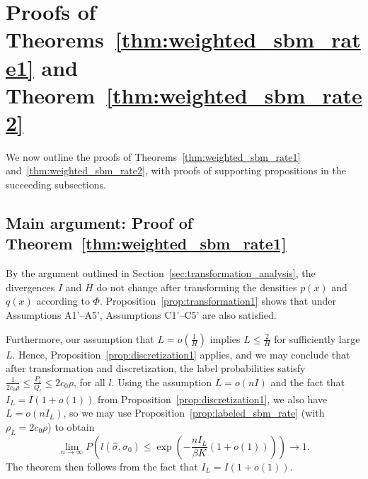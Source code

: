 \documentclass{article}
\begin{document}

\section{Proofs of Theorems~\ref{thm:weighted_sbm_rate1} and Theorem~\ref{thm:weighted_sbm_rate2}}
\label{sec:transformation_proof}

We now outline the proofs of Theorems~\ref{thm:weighted_sbm_rate1} and~\ref{thm:weighted_sbm_rate2}, with proofs of supporting propositions in the succeeding subsections.

\subsection{Main argument: Proof of Theorem~\ref{thm:weighted_sbm_rate1}}
\label{AppThmRate1}

By the argument outlined in Section~\ref{sec:transformation_analysis}, the divergences $I$ and $H$ do not change after transforming the densities $p(x)$ and $q(x)$ according to $\Phi$. 
Proposition~\ref{prop:transformation1} shows that under Assumptions A1'--A5', Assumptions C1'--C5' are also satisfied.

Furthermore, our assumption that $L = o(\frac{1}{H})$ implies $L \leq \frac{2}{H}$ for sufficiently large $L$. Hence, Proposition~\ref{prop:discretization1} applies, and we may conclude that after transformation and discretization, the label probabilities satisfy $\frac{1}{2c_0 \rho} \leq \frac{P_l}{Q_l} \leq 2c_0 \rho$, for all $l$. Using the assumption $L = o(nI)$ and the fact that $I_L = I (1 + o(1))$ from Proposition~\ref{prop:discretization1}, we also have $L = o(n I_L)$, so we may use Proposition~\ref{prop:labeled_sbm_rate} (with $\rho_L = 2 c_0 \rho$) to obtain
\[
\lim_{n \rightarrow \infty} P \left( l(\hat{\sigma}, \sigma_0) \leq \exp \left( - \frac{ n I_L}{ \beta K} (1 + o(1)) \right) \right) \rightarrow 1.
\]
The theorem then follows from the fact that $I_L = I(1+o(1))$. 
\end{document}
